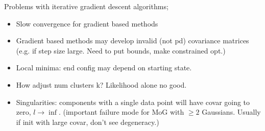 \documentclass{article}
\begin{document}
Problems with iterative gradient descent algorithms; \begin{itemize}
	\item Slow convergence for gradient based methods
	\item Gradient based methods may develop invalid (not pd) covariance matrices (e.g. if step size large. Need to put bounds, make constrained opt.)
	\item Local minima: end config may depend on starting state.
	\item How adjust num clusters k? Likelihood alone no good.
	\item Singularities: components with a single data point will have covar going to zero, $l\rightarrow\inf$. (important failure mode for MoG with $\geq 2$ Gaussians. Usually if init with large covar, don't see degeneracy.)
	
\end{itemize}
\end{document}
